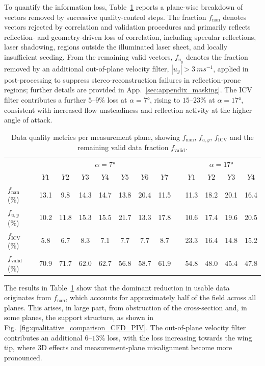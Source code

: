 \documentclass[wes, manuscript]{copernicus}
\begin{document}
To quantify the information loss, Table~\ref{tab:data_quality_breakdown} reports a plane-wise breakdown of vectors removed by successive quality-control steps. The fraction $f_{\mathrm{nan}}$ denotes vectors rejected by correlation and validation procedures and primarily reflects reflection- and geometry-driven loss of correlation, including specular reflections, laser shadowing, regions outside the illuminated laser sheet, and locally insufficient seeding. From the remaining valid vectors, $f_{u_y}$ denotes the fraction removed by an additional out-of-plane velocity filter, $|u_y|>3~\unit{m s^{-1}}$, applied in post-processing to suppress stereo-reconstruction failures in reflection-prone regions; further details are provided in App.~\ref{sec:appendix_masking}. 
The ICV filter contributes a further $5$--$9\%$ loss at $\alpha=7\unit{\degree}$, rising to $15$--$23\%$ at $\alpha=17\unit{\degree}$, consistent with increased flow unsteadiness and reflection activity at the higher angle of attack.
%
\begin{table}[htp]
    \centering
    \caption{Data quality metrics per measurement plane, showing $f_{\mathrm{nan}}$, $f_{u,y}$, $f_\mathrm{ICV}$ and the remaining valid data fraction $f_\mathrm{valid}$.}
    \label{tab:data_quality_breakdown}
    \begin{tabular}{l ccccccc l cccc}
    \hline
    & \multicolumn{7}{c}{$\alpha = 7\unit{\degree}$} & & \multicolumn{4}{c}{$\alpha = 17\unit{\degree}$} \\
     & $Y1$ & $Y2$ & $Y3$ & $Y4$ & $Y5$ & $Y6$ & $Y7$ & & $Y1$ & $Y2$ & $Y3$ & $Y4$ \\
    \hline
    $f_\mathrm{nan}$ (\%) & 13.1 & 9.8 & 14.3 & 14.7 & 13.8 & 20.4 & 11.5 & & 11.3 & 18.2 & 20.1 & 16.4 \\
    $f_{u,y}$ (\%) & 10.2 & 11.8 & 15.3 & 15.5 & 21.7 & 13.3 & 17.8 & & 10.6 & 17.4 & 19.6 & 20.5 \\
    $f_\mathrm{ICV}$ (\%) & 5.8 & 6.7 & 8.3 & 7.1 & 7.7 & 7.7 & 8.7 & & 23.3 & 16.4 & 14.8 & 15.2 \\
    $f_\mathrm{valid}$ (\%) & 70.9 & 71.7 & 62.0 & 62.7 & 56.8 & 58.7 & 61.9 & & 54.8 & 48.0 & 45.4 & 47.8 \\
    \hline
    \end{tabular}
\end{table}

The results in Table~\ref{tab:data_quality_breakdown} show that the dominant reduction in usable data originates from $f_{\mathrm{nan}}$, which accounts for approximately half of the field across all planes.
This arises, in large part, from obstruction of the cross-section and, in some planes, the support structure, as shown in Fig.~\ref{fig:qualitative_comparison_CFD_PIV}. 
The out-of-plane velocity filter contributes an additional $6$--$13\%$ loss, with the loss increasing towards the wing tip, where 3D effects and measurement-plane misalignment become more pronounced. 
\end{document}
